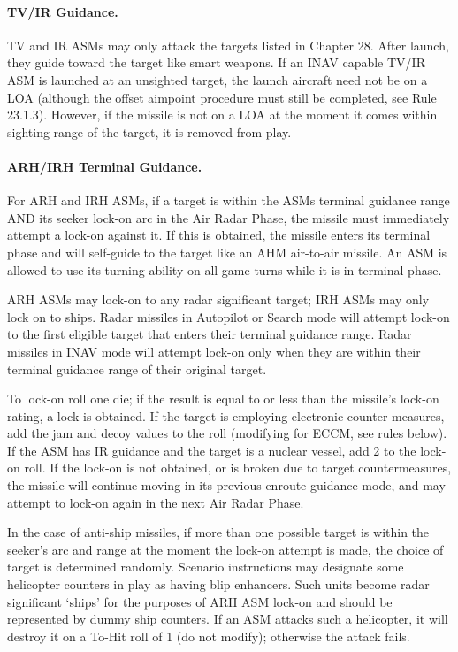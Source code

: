 \begin{advancedrules}
\begin{itemize}
\end{itemize}

\paragraph{TV/IR Guidance.} TV and IR ASMs may only attack the targets listed in Chapter 28.  After launch, they guide toward the target like smart weapons. If an INAV capable TV/IR ASM is launched at an unsighted target, the launch aircraft need not be on a LOA (although the offset aimpoint procedure must still be completed, see Rule 23.1.3).  However, if the missile is not on a LOA at the moment it comes within sighting range of the target, it is removed from play.

\paragraph{ARH/IRH Terminal Guidance.} For ARH and IRH ASMs, if a target is within the ASMs terminal guidance range AND its seeker lock-on arc in the Air Radar Phase, the missile must immediately attempt a lock-on against it.  If this is obtained, the missile enters its terminal phase and will self-guide to the target like an AHM air-to-air missile.  An ASM is allowed to use its turning ability on all game-turns while it is in terminal phase.

ARH ASMs may lock-on to any radar significant target; IRH ASMs may only lock on to ships.  Radar missiles in Autopilot or Search mode will attempt lock-on to the first eligible target that enters their terminal guidance range.  Radar missiles in INAV mode will attempt lock-on only when they are within their terminal guidance range of their original target.

To lock-on roll one die; if the result is equal to or less than the missile's lock-on rating, a lock is obtained. If the target is employing electronic counter-measures, add the jam and decoy values to the roll (modifying for ECCM, see rules below).  If the ASM has IR guidance and the target is a nuclear vessel, add 2 to the lock-on roll.  If the lock-on is not obtained, or is broken due to target countermeasures, the missile will continue moving in its previous enroute guidance mode, and may attempt to lock-on again in the next Air Radar Phase.

In the case of anti-ship missiles, if more than one possible target is within the seeker's arc and range at the moment the lock-on attempt is made, the choice of target is determined randomly. Scenario instructions may designate some helicopter counters in play as having blip enhancers. Such units become radar significant ‘ships' for the purposes of ARH ASM lock-on and should be represented by dummy ship counters.  If an ASM attacks such a helicopter, it will destroy it on a To-Hit roll of 1 (do not modify); otherwise the attack fails.


\end{advancedrules}
